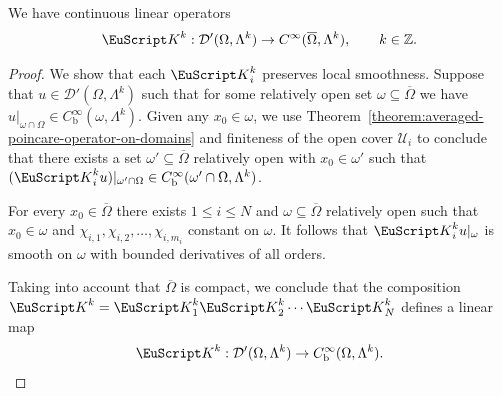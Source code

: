 \documentclass[10pt,a4paper]{amsart}
\theoremstyle{definition}
\theoremstyle{remark}
\numberwithin{equation}{section}
\newcommand{\bbZ}{{\mathbb Z}}
\newcommand{\calD}{{\mathcal D}}
\newcommand{\calU}{{\mathcal U}}
\newcommand{\euK}{{\EuScript K}}
\newcommand{\closure}{\overline}
\renewcommand{\restriction}{|}
\newcommand{\Domain}{{\Omega}}
\newcommand{\subdomain}{{\omega}}
\newcommand{\Cover}{\calU}
\newcommand{\Alt}[1]{\Lambda^{#1}}
\newcommand{\Defect}{\euK}
\newcommand{\bounded}{\mathrm{b}}
\begin{document}
\begin{theorem}\label{theorem:remainder-operator-is-smoothing}
    We have continuous linear operators 
    \begin{align}\label{math:defect-operator:distributions}
        \Defect^{k} : \calD'(\Domain,\Alt{k}) \to C^{\infty}(\closure\Domain,\Alt{k})
        ,
        \qquad 
        k \in \bbZ
        .
    \end{align}
\end{theorem}

\begin{proof} 
We show that each $\Defect^{k}_{i}$ preserves local smoothness. 
    Suppose that $u \in \calD'(\Domain,\Alt{k})$ such that for some relatively open set $\subdomain \subseteq \closure\Domain$ 
    we have $u \restriction_{\subdomain \cap \Domain} \in C^{\infty}_{\bounded}(\subdomain,\Alt{k})$.
    Given any $x_{0} \in \subdomain$, 
    we use Theorem~\ref{theorem:averaged-poincare-operator-on-domains} and finiteness of the open cover $\Cover_{i}$ 
    to conclude that there exists a set $\subdomain' \subseteq \closure\Domain$ relatively open with $x_{0} \in \subdomain'$
    such that 
    $( \Defect^{k}_{i} u ) \restriction_{\subdomain' \cap \Domain} \in C^{\infty}_{\bounded}(\subdomain' \cap \Domain,\Alt{k})$. 
    


    For every $x_{0} \in \closure\Domain$ there exists $1 \leq i \leq N$ and $\subdomain \subseteq \closure\Domain$ relatively open 
    such that $x_{0} \in \subdomain$ and $\chi_{i,1}, \chi_{i,2}, \dots, \chi_{i,m_{i}}$ constant on $\subdomain$. 
    It follows that $\Defect^{k}_{i} u \restriction_{\subdomain}$ is smooth on $\subdomain$ with bounded derivatives of all orders. 
    


    Taking into account that $\closure\Domain$ is compact, 
    we conclude that the composition $\Defect^{k} = \Defect^{k}_{1} \Defect^{k}_{2} \cdots \Defect^{k}_{N}$ defines a linear map 
    \begin{align}\label{math:defect-operator-as-linear-map}
        \Defect^{k} : \calD'(\Domain,\Alt{k}) \to C^{\infty}_{\bounded}(\Domain,\Alt{k}).
    \end{align}


    



\end{proof}
\end{document}
